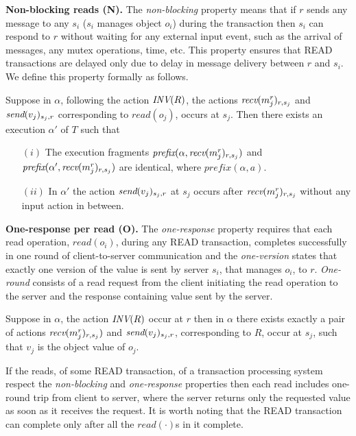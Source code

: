 {\bf Non-blocking reads (N).} The \emph{non-blocking} property means that if $r$ sends any message to any $s_i$ ($s_i$ manages object $o_i$) during the transaction then  $s_i$ can  respond to  $r$ without waiting for any external input event, such as the arrival of messages, any mutex operations, time, etc. This property ensures that {\sc READ} transactions are delayed only due to delay in message delivery between $r$ and $s_i$. We define this property formally as follows.

\begin{definition}[Non-blocking read (N)]
 Suppose in  $\alpha$, following the action ${\textit{INV}(R)}$,  the actions  ${\textit{recv}(m_j^{r})_{r, s_j}}$ and   ${\textit{send}(v_j)_{ s_j, r}}$
   corresponding to $read(o_j)$, occurs at $s_j$.  Then there  exists an execution $\alpha'$ of $T$ such that
  \begin{enumerate}
  \item[ $(i)$ ] The execution fragments 
 $\textit{prefix}( \alpha, {\textit{recv}(m_j^{r})_{r, s_j}})$ and $\textit{prefix}( \alpha', {\textit{recv}(m_j^{r})_{r, s_j}})$ are identical, where
 $\textit{prefix}(\alpha, a)$.
 \item [ $(ii)$] In $\alpha'$ the action  ${\textit{send}(v_j)_{ s_j, r}}$ at $s_j$ occurs after ${\textit{recv}(m_j^{r})_{r, s_j}}$ without any input action in between.
\end{enumerate}
\end{definition}
  
{\bf One-response per read (O).} The \emph{one-response} property requires that each read operation, $read(o_i)$,  during any
READ transaction, completes successfully in one round of client-to-server communication and the \emph{one-version}  states that exactly one version of the value is sent by server $s_i$, that manages $o_i$, to $r$. \emph{One-round} consists of 
a read  request from the client initiating the read operation to the server  and  the response containing value sent by the server.

\begin{definition}[One response per read (O)]
 Suppose in  $\alpha$, the action ${\textit{INV}(R)}$ occur at $r$  then in $\alpha$ there exists  exactly a pair of actions $ {\textit{recv}(m_j^{r})_{r, s_j}})$ and   ${\textit{send}(v_j)_{ s_j, r}}$, corresponding to $R$,  occur at $s_j$, such that 
 $v_j$ is the object value of $o_j$.
\end{definition}
If the reads,  of some READ transaction, of a transaction processing system respect the \emph{non-blocking} and \emph{one-response} properties then each read includes one-round trip from client to server,  where the server returns only the requested value as soon as it receives the request. It is worth noting that the READ transaction can complete only after all the $read(\cdot)$s in it complete.

